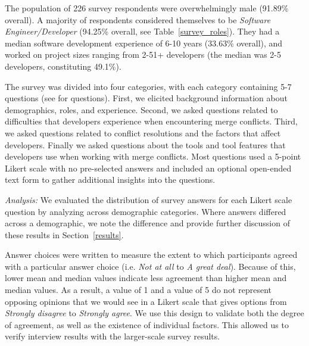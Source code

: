 The population of 226 survey respondents were overwhelmingly male (91.89\% overall). A majority of respondents considered themselves to be \textit{Software Engineer/Developer} (94.25\% overall, see Table~\ref{survey_roles}). They had a median software development experience of 6-10 years (33.63\% overall), and worked on project sizes ranging from 2-51+ developers (the median was 2-5 developers, constituting 49.1\%).

The survey was divided into four categories, with each category containing 5-7 questions (see \cite{companion_site} for questions).
First, we elicited background information about demographics, roles, and experience.
Second, we asked questions related to difficulties that developers experience when encountering merge conflicts.
Third, we asked questions related to conflict resolutions and the factors that affect developers.
Finally we asked questions about the tools and tool features that developers use when working with merge conflicts.
Most questions used a 5-point Likert scale with no pre-selected answers and included an optional open-ended text form to gather additional insights into the questions. 

\textit{Analysis:} We evaluated the distribution of survey answers for each Likert scale question by analyzing across demographic categories.
Where answers differed across a demographic, we note the difference and provide further discussion of these results in Section~\ref{results}.

Answer choices were written to measure the extent to which participants agreed with a particular answer choice (i.e. \textit{Not at all} to \textit{A great deal}). Because of this, lower mean and median values indicate less agreement than higher mean and median values. As a result, a value of 1 and a value of 5 do not represent opposing opinions that we would see in a Likert scale that gives options from \textit{Strongly disagree} to \textit{Strongly agree}.
We use this design to validate both the degree of agreement, as well as the existence of individual factors.
This allowed us to verify interview results with the larger-scale survey results.